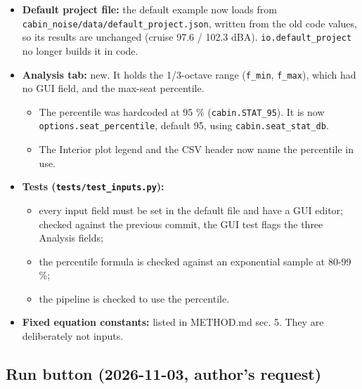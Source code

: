 \documentclass[10pt,a4paper]{article}
\begin{document}
\begin{itemize}
\item \textbf{Default project file:} the default example now loads from \texttt{cabin\_\allowbreak{}noise/\allowbreak{}data/\allowbreak{}default\_\allowbreak{}project.\allowbreak{}json}, written from the old code values, so its results are unchanged (cruise 97.6 / 102.3 dBA). \texttt{io.\allowbreak{}default\_\allowbreak{}project} no longer builds it in code.
\item \textbf{Analysis tab:} new. It holds the 1/3-octave range (\texttt{f\_\allowbreak{}min}, \texttt{f\_\allowbreak{}max}), which had no GUI field, and the max-seat percentile.
\begin{itemize}
\item The percentile was hardcoded at 95 \% (\texttt{cabin.\allowbreak{}STAT\_\allowbreak{}95}). It is now \texttt{options.\allowbreak{}seat\_\allowbreak{}percentile}, default 95, using \texttt{cabin.\allowbreak{}seat\_\allowbreak{}stat\_\allowbreak{}db}.
\item The Interior plot legend and the CSV header now name the percentile in use.
\end{itemize}
\item \textbf{Tests (\texttt{tests/\allowbreak{}test\_\allowbreak{}inputs.\allowbreak{}py}):}
\begin{itemize}
\item every input field must be set in the default file and have a GUI editor; checked against the previous commit, the GUI test flags the three Analysis fields;
\item the percentile formula is checked against an exponential sample at 80-99 \%;
\item the pipeline is checked to use the percentile.
\end{itemize}
\item \textbf{Fixed equation constants:} listed in METHOD.md sec. 5. They are deliberately not inputs.
\end{itemize}

\subsection*{Run button (2026-11-03, author's request)}
\end{document}
